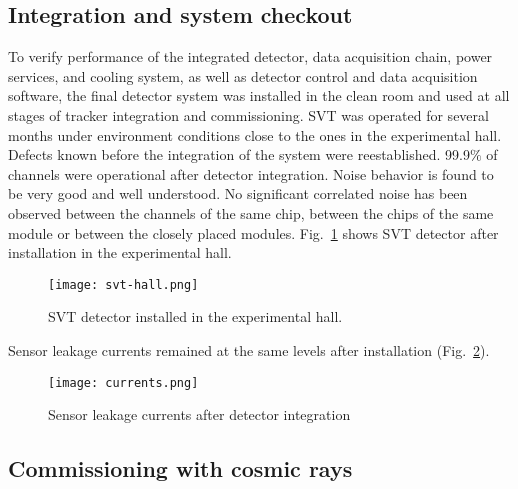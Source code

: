 %

\subsection{Integration and system checkout}

To verify performance of the integrated detector, data acquisition chain, power services, and cooling system, as well as detector control and data acquisition software, the final detector system was installed in the clean room and used at all stages of tracker integration and commissioning. SVT was operated for several months under environment conditions close to the ones in the experimental hall. Defects known before the integration of the system were reestablished. 99.9$\%$ of channels were operational after detector integration. Noise behavior is found to be very good and well understood. No significant correlated noise has been observed between the channels of the same chip, between the chips of the same module or between the closely placed modules. Fig.~\ref{fig:svt-hall} shows SVT detector after installation in the experimental hall. 
 
\begin{figure}[hbt] 
\centering 
\texttt{[image: svt-hall.png]}
\caption{SVT detector installed in the experimental hall.}
\label{fig:svt-hall}
\end{figure}

Sensor leakage currents remained at the same levels after installation (Fig.~\ref{fig:currents}).

\begin{figure}[hbt] 
\centering 
\texttt{[image: currents.png]}
\caption{Sensor leakage currents after detector integration}
\label{fig:currents}
\end{figure}

\subsection{Commissioning with cosmic rays}


